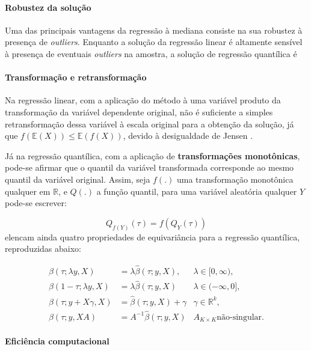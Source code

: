 \documentclass[a4paper, 12pt]{article}
\let\oldparagraph\paragraph
\renewcommand{\paragraph}[1]{\oldparagraph{#1}\mbox{}}
\begin{document}
\hypertarget{robustez-da-solucao}{%
\paragraph{Robustez da solução}\label{robustez-da-solucao}}

Uma das principais vantagens da regressão à mediana consiste na sua
robustez à presença de \emph{outliers}. Enquanto a solução da regressão
linear é altamente sensível à presença de eventuais \emph{outliers} na
amostra, a solução de regressão quantílica é

\hypertarget{transformacao-e-retransformacao}{%
\paragraph{Transformação e
retransformação}\label{transformacao-e-retransformacao}}

Na regressão linear, com a aplicação do método à uma variável produto da
transformação da variável dependente original, não é suficiente a
simples retransformação dessa variável à escala original para a obtenção
da solução, já que \(f(\mathbb{E}(X)) \leq \mathbb{E}(f(X))\), devido à
desigualdade de Jensen \autocite[ver][p.~207]{moda_media_mediana}.

Já na regressão quantílica, com a aplicação de \textbf{transformações
monotônicas}, pode-se afirmar que o quantil da variável transformada
corresponde ao mesmo quantil da variável original. Assim, seja \(f(.)\)
uma transformação monotônica qualquer em \(\mathbb{R}\), e \(Q(.)\) a
função quantil, para uma variável aleatória qualquer \(Y\) pode-se
escrever:

\[Q_{f(Y)}(\tau) = f(Q_Y(\tau))\] \textcite[p.~39-40]{koenker1978}
elencam ainda quatro propriedades de equivariância para a regressão
quantílica, reproduzidas abaixo:

\[
\begin{aligned}
\hat \beta(\tau;\lambda y,X) &= \lambda \hat \beta(\tau; y, X), & \lambda \in[0,\infty), \\
\hat \beta(1-\tau;\lambda y,X) &= \lambda \hat \beta(\tau; y, X) & \lambda \in (-\infty,0],\\
\hat \beta(\tau;y + X\gamma,X)& = \hat \beta(\tau; y, X) + \gamma & \gamma \in \mathbb{R}^k,\\
\hat \beta(\tau;y,XA) &= A^{-1} \hat \beta(\tau; y, X) & A_{K \times K} \text{não-singular.}
\end{aligned}
\]

\hypertarget{eficiencia-computacional}{%
\paragraph{Eficiência computacional}\label{eficiencia-computacional}}
\end{document}
